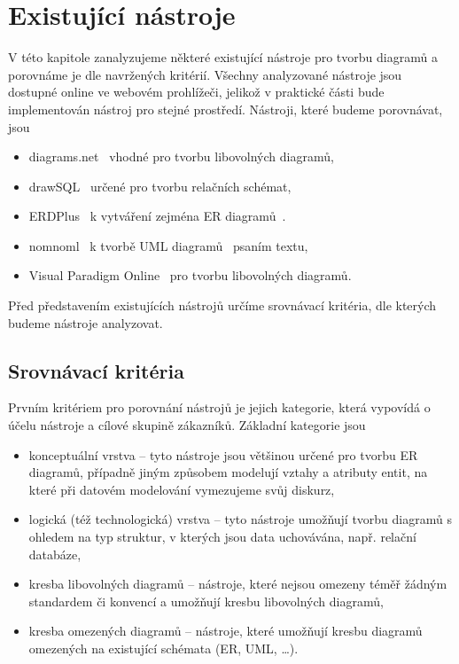 \chapter{Existující nástroje}

V této kapitole zanalyzujeme některé existující nástroje pro tvorbu diagramů a porovnáme je dle navržených kritérií.
Všechny analyzované nástroje jsou dostupné online ve webovém prohlížeči, jelikož v praktické části bude implementován nástroj pro stejné prostředí.
Nástroji, které budeme porovnávat, jsou
\begin{itemize}
  \item diagrams.net~\cite{drawio_2023} vhodné pro tvorbu libovolných diagramů,
  \item drawSQL~\cite{drawsql_2021} určené pro tvorbu relačních schémat,
  \item ERDPlus~\cite{erdplus_2023} k vytváření zejména ER diagramů~\cite{chen_er_1976}.
  \item nomnoml~\cite{nomnoml_2022} k tvorbě UML diagramů~\cite{omg_uml_2017} psaním textu,
  \item Visual Paradigm Online~\cite{vpo_2022} pro tvorbu libovolných diagramů.
\end{itemize}

Před představením existujících nástrojů určíme srovnávací kritéria, dle kterých budeme nástroje analyzovat.

\section{Srovnávací kritéria}

Prvním kritériem pro porovnání nástrojů je jejich kategorie, která vypovídá o účelu nástroje a cílové skupině zákazníků.
Základní kategorie jsou
\begin{itemize}
  \item konceptuální vrstva -- tyto nástroje jsou většinou určené pro tvorbu ER diagramů, případně jiným způsobem modelují vztahy a atributy entit, na které při datovém modelování vymezujeme svůj diskurz,
  \item logická (též technologická) vrstva -- tyto nástroje umožňují tvorbu diagramů s ohledem na typ struktur, v kterých jsou data uchovávána, např. relační databáze,
  \item kresba libovolných diagramů -- nástroje, které nejsou omezeny téměř žádným standardem či konvencí a umožňují kresbu libovolných diagramů,
  \item kresba omezených diagramů -- nástroje, které umožňují kresbu diagramů omezených na existující schémata (ER, UML, \dots).
\end{itemize}

